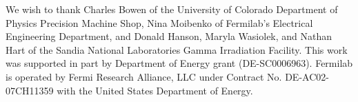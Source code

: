 We wish to thank Charles Bowen of the University of Colorado
Department of Physics Precision Machine Shop, Nina Moibenko of Fermilab's Electrical Engineering Department,
and Donald Hanson, 
Maryla Wasiolek, and Nathan Hart of the Sandia National Laboratories Gamma
Irradiation Facility.
This work was supported in part by Department of Energy grant (DE-SC0006963).  Fermilab is operated by Fermi Research Alliance, LLC under Contract No. DE-AC02-07CH11359 with the United States Department of Energy.